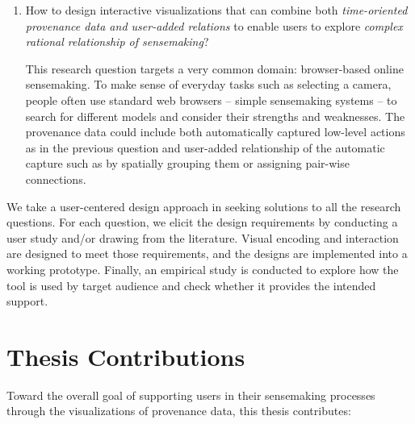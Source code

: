 \begin{enumerate}
	\item How to design interactive visualizations that can combine both \emph{time-oriented provenance data and user-added relations} to enable users to explore \emph{complex rational relationship of sensemaking}?
	
	This research question targets a very common domain: browser-based online sensemaking. To make sense of everyday tasks such as selecting a camera, people often use standard web browsers -- simple sensemaking systems -- to search for different models and consider their strengths and weaknesses. The provenance data could include both automatically captured low-level actions as in the previous question and user-added relationship of the automatic capture such as by spatially grouping them or assigning pair-wise connections.
\end{enumerate}

We take a user-centered design approach in seeking solutions to all the research questions. For each question, we elicit the design requirements by conducting a user study and/or drawing from the literature. Visual encoding and interaction are designed to meet those requirements, and the designs are implemented into a working prototype. Finally, an empirical study is conducted to explore how the tool is used by target audience and check whether it provides the intended support. 

\section{Thesis Contributions}
Toward the overall goal of supporting users in their sensemaking processes through the visualizations of provenance data, this thesis contributes:

